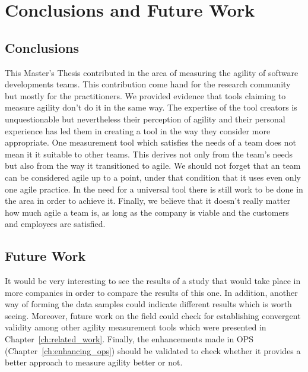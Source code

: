\chapter{Conclusions and Future Work}
\label{ch:conclusions_future_work}

\section{Conclusions}

This Master's Thesis contributed in the area of measuring the agility of software developments teams. This contribution come hand for the research community but mostly for the practitioners. We provided evidence that tools claiming to measure agility don't do it in the same way. The expertise of the tool creators is unquestionable but nevertheless their perception of agility and their personal experience has led them in creating a tool in the way they consider more appropriate. One measurement tool which satisfies the needs of a team does not mean it it suitable to other teams. This derives not only from the team's needs but also from the way it transitioned to agile. We should not forget that an team can be considered agile up to a point, under that condition that it uses even only one agile practice. In the need for a universal tool there is still work to be done in the area in order to achieve it. Finally, we believe that it doesn't really matter how much agile a team is, as long as the company is viable and the customers and employees are satisfied.

\section{Future Work}

It would be very interesting to see the results of a study that would take place in more companies in order to compare the results of this one. In addition, another way of forming the data samples could indicate different results which is worth seeing. Moreover, future work on the field could check for establishing convergent validity among other agility measurement tools which were presented in Chapter~\ref{ch:related_work}. Finally, the enhancements made in \ac{OPS} (Chapter~\ref{ch:enhancing_ops}) should be validated to check whether it provides a better approach to measure agility better or not.